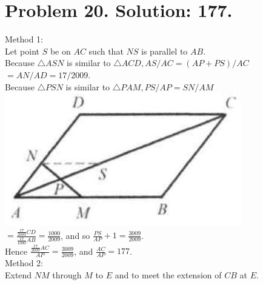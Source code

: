 \documentclass[10pt]{article}
\begin{document}
\section*{Problem 20. Solution: 177.}
Method 1:\\
Let point \(S\) be on \(A C\) such that \(N S\) is parallel to \(A B\).\\
Because \(\triangle A S N\) is similar to \(\triangle A C D, A S / A C=(A P+P S) / A C\) \(=A N / A D=17 / 2009\).\\
Because \(\triangle P S N\) is similar to \(\triangle P A M, P S / A P=S N / A M\)\\
\includegraphics[max width=\textwidth, center]{2025_04_17_97bc1f7e44d93c271a88g-141(2)}\\
\(=\frac{\frac{17}{2009} C D}{\frac{17}{1000} A B}=\frac{1000}{2009}\), and so \(\frac{P S}{A P}+1=\frac{3009}{2009}\).\\
Hence \(\frac{\frac{17}{2009} A C}{A P}=\frac{3009}{2009}\), and \(\frac{A C}{A P}=177\).\\
Method 2:\\
Extend \(N M\) through \(M\) to \(E\) and to meet the extension of \(C B\) at \(E\).
\end{document}

